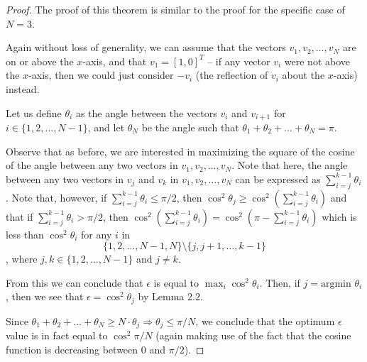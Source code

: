 \documentclass[11pt,letterpaper,twoside,english]{article}
\theoremstyle{theorem}
\theoremstyle{remark}
\begin{document}
\begin{proof}
The proof of this theorem is similar to the proof for the specific case of $N=3$.

Again without loss of generality, we can assume that the vectors $v_1, v_2, \ldots, v_N$ are on or above the $x$-axis, and that $v_1 = [1,0]^T$ -- if any vector $v_i$ were not above the $x$-axis, then we could just consider $-v_i$ (the reflection of $v_i$ about the $x$-axis) instead.

Let us define $\theta_i$ as the angle between the vectors $v_i$ and $v_{i+1}$ for $i \in \{1, 2, \ldots, N-1\}$, and let $\theta_N$ be the angle such that $\theta_1 + \theta_2 + \ldots + \theta_N = \pi$.

Observe that as before, we are interested in maximizing the square of the cosine of the angle between any two vectors in $v_1, v_2, \ldots, v_N$. Note that here, the angle between any two vectors in $v_j$ and $v_k$ in $v_1, v_2, \ldots, v_N$ can be expressed as $\sum_{i=j} ^{k-1} \theta_i$. Note that, however, if $\sum_{i=j}^{k-1} \theta_i \leq \pi/2$, then $\cos^2 \theta_j \geq \cos^2(\sum_{i=j}^{k-1} \theta_i)$ and that if $\sum_{i=j}^{k-1} \theta_i > \pi/2$, then $\cos^2 (\sum_{i=j}^{k-1} \theta_i) = \cos^2 (\pi - \sum_{i=j}^{k-1} \theta_i)$ which is less than $\cos^2 \theta_i$ for any $i$ in $$\{1, 2, \ldots, N-1, N\} \setminus \{j, j+1, \ldots, k-1\}$$, where $j, k \in \{1, 2, \ldots, N-1\}$ and $j \neq k$.

From this we can conclude that $\epsilon$ is equal to $\max_i \cos^2 \theta_i$. Then, if $j = \text{argmin } \theta_i$, then we see that $\epsilon = \cos^2 \theta_j$ by Lemma $2.2$.

Since $\theta_ 1 + \theta_2 + \ldots + \theta_N \geq N \cdot \theta_j \Rightarrow \theta_j \leq \pi/N$, we conclude that the optimum $\epsilon$ value is in fact equal to $\cos^2 \pi/N$ (again making use of the fact that the cosine function is decreasing between $0$ and $\pi/2$).
\end{proof}
\end{document}
